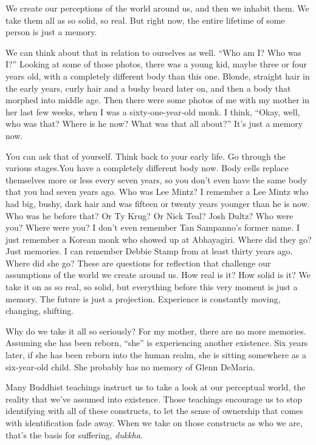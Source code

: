 We create our perceptions of the world around us, and then we inhabit them. We take them all as so solid, so real. But right now, the entire lifetime of some person is just a memory.

We can think about that in relation to ourselves as well. ``Who am I? Who was I?'' Looking at some of those photos, there was a young kid, maybe three or four years old, with a completely different body than this one. Blonde, straight hair in the early years, curly hair and a bushy beard later on, and then a body that morphed into middle age. Then there were some photos of me with my mother in her last few weeks, when I was a sixty-one-year-old monk. I think, ``Okay, well, who was that? Where is he now? What was that all about?'' It's just a memory now.

You can ask that of yourself. Think back to your early life. Go through the various stages.You have a completely different body now. Body cells replace themselves more or less every seven years, so you don't even have the same body that you had seven years ago. Who was Lee Mintz? I remember a Lee Mintz who had big, bushy, dark hair and was fifteen or twenty years younger than he is now. Who was he before that? Or Ty Krug? Or Nick Teal? Josh Dultz? Who were you? Where were you? I don't even remember Tan Sampanno's former name. I just remember a Korean monk who showed up at Abhayagiri. Where did they go? Just memories. I can remember Debbie Stamp from at least thirty years ago. Where did she go? These are questions for reflection that challenge our assumptions of the world we create around us. How real is it? How solid is it? We take it on as so real, so solid, but everything before this very moment is just a memory. The future is just a projection. Experience is constantly moving, changing, shifting.

Why do we take it all so seriously? For my mother, there are no more memories. Assuming she has been reborn, ``she'' is experiencing another existence. Six years later, if she has been reborn into the human realm, she is sitting somewhere as a six-year-old child. She probably has no memory of Glenn DeMaria.~

Many Buddhist teachings instruct us to take a look at our perceptual world, the reality that we've assumed into existence. Those teachings encourage us to stop identifying with all of these constructs, to let the sense of ownership that comes with identification fade away. When we take on those constructs as who we are, that's the basis for suffering, \emph{dukkha}.~

